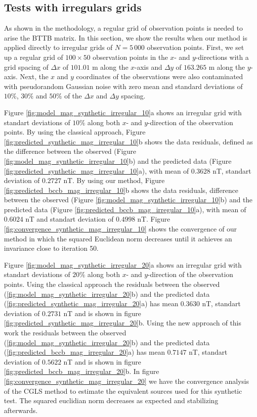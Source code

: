 \subsection*{Tests with irregulars grids}

As shown in the methodology, a regular grid of observation points is needed to arise the BTTB matrix. In this section, we show the results when our method is applied directly to irregular grids of $N = 5 \, 000$ observation points. 
First, we set up a regular grid of $100 \times 50$ observation points in the $x$- and $y$-directions with a grid spacing of $\Delta x$ of $101.01$ m along the $x$-axis and $\Delta y$ of
$163.265$ m along the $y$-axis. Next, the $x$ and $y$ coordinates of the observations were also contaminated with pseudorandom Gaussian noise with zero mean and standard deviations of $10\%$, $30\%$ and $50\%$ of the 
$\Delta x$ and $\Delta y$ spacing.

Figure \ref{fig:model_mag_synthetic_irregular_10}a shows an irregular grid with standart deviations of $10\%$ along both $x$- and $y$-direction of the observation points. 
By using the classical approach, Figure \ref{fig:predicted_synthetic_mag_irregular_10}b shows the data residuals,  defined as the difference between the observed  (Figure \ref{fig:model_mag_synthetic_irregular_10}b) and the predicted data (Figure \ref{fig:predicted_synthetic_mag_irregular_10}a), with mean of $0.3628$ nT, standart deviation of $0.2727$ nT. 
By using our method, Figure \ref{fig:predicted_bccb_mag_irregular_10}b shows the data residuals, difference between the observed (Figure \ref{fig:model_mag_synthetic_irregular_10}b) and the predicted data (Figure \ref{fig:predicted_bccb_mag_irregular_10}a), with mean of $0.6024$ nT and standart deviation of $0.4998$ nT.
Figure \ref{fig:convergence_synthetic_mag_irregular_10} shows the convergence of our method in which the squared Euclidean norm decreases until it achieves an invariance close to iteration 50. 

Figure \ref{fig:model_mag_synthetic_irregular_20}a shows an irregular grid with standart deviations of $20\%$ along both $x$- and $y$-direction of the observation points. Using the classical approach the residuals between the observed (\ref{fig:model_mag_synthetic_irregular_20}b) and the predicted data (\ref{fig:predicted_synthetic_mag_irregular_20}a) has mean $0.3630$ nT, standart deviation of $0.2731$ nT and is shown in figure \ref{fig:predicted_synthetic_mag_irregular_20}b. Using the new approach of this work the residuals between the observed (\ref{fig:model_mag_synthetic_irregular_20}b) and the predicted data (\ref{fig:predicted_bccb_mag_irregular_20}a) has mean $0.7147$ nT, standart deviation of $0.5622$ nT and is shown in figure \ref{fig:predicted_bccb_mag_irregular_20}b.
In figure \ref{fig:convergence_synthetic_mag_irregular_20} we have the convergence analysis of the CGLS method to estimate the equivalent sources used for this synthetic test. The squared euclidian norm decreases as expected and stabilizing afterwards.

